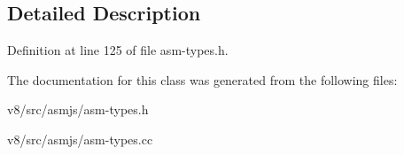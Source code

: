 \subsection{Detailed Description}


Definition at line 125 of file asm-\/types.\+h.



The documentation for this class was generated from the following files\+:\begin{DoxyCompactItemize}
\item 
v8/src/asmjs/asm-\/types.\+h\item 
v8/src/asmjs/asm-\/types.\+cc\end{DoxyCompactItemize}
